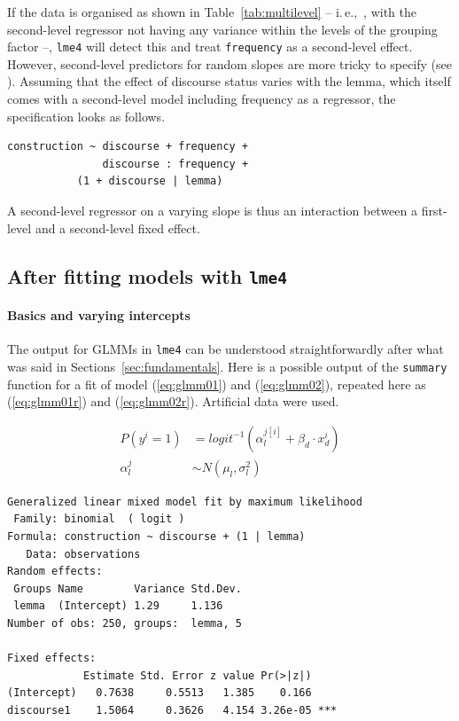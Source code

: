 \documentclass[a4paper,12pt]{article}
\newcommand{\ie}{i.\,e.,\ }
\begin{document}
If the data is organised as shown in Table~\ref{tab:multilevel} -- \ie, with the second-level regressor not having any variance within the levels of the grouping factor --, \texttt{lme4} will detect this and treat \texttt{frequency} as a second-level effect.
However, second-level predictors for random slopes are more tricky to specify (see \citealt[280-282]{GelmanHill2006}).
Assuming that the effect of discourse status varies with the lemma, which itself comes with a second-level model including frequency as a regressor, the specification looks as follows.

\vspace{0.5\baselineskip}

\begin{lstlisting}
construction ~ discourse + frequency +
               discourse : frequency +
	       (1 + discourse | lemma)
\end{lstlisting}

A second-level regressor on a varying slope is thus an interaction between a first-level and a second-level fixed effect.

\subsection{After fitting models with \texttt{lme4}}
\label{sec:afterfittingmodelswithlme4}

\paragraph{Basics and varying intercepts}

The output for GLMMs in \texttt{lme4} can be understood straightforwardly after what was said in Sections~\ref{sec:fundamentals}.
Here is a possible output of the \texttt{summary} function for a fit of model (\ref{eq:glmm01}) and (\ref{eq:glmm02}), repeated here as (\ref{eq:glmm01r}) and (\ref{eq:glmm02r}).
Artificial data were used.

\begin{align}
  P(y^i=1) & = logit^{-1}(\alpha_{l}^{j[i]}+\beta_d\cdot x_d^i)
  \label{eq:glmm01r} \\
  \alpha_l^j & \sim N(\mu_l,\sigma_l^2)
  \label{eq:glmm02r}
\end{align}

\vspace{0.5\baselineskip}

\begin{lstlisting}
Generalized linear mixed model fit by maximum likelihood 
 Family: binomial  ( logit )
Formula: construction ~ discourse + (1 | lemma)
   Data: observations
Random effects:
 Groups Name        Variance Std.Dev.
 lemma  (Intercept) 1.29     1.136   
Number of obs: 250, groups:  lemma, 5

Fixed effects:
            Estimate Std. Error z value Pr(>|z|)    
(Intercept)   0.7638     0.5513   1.385    0.166    
discourse1    1.5064     0.3626   4.154 3.26e-05 ***
\end{lstlisting}
\end{document}
